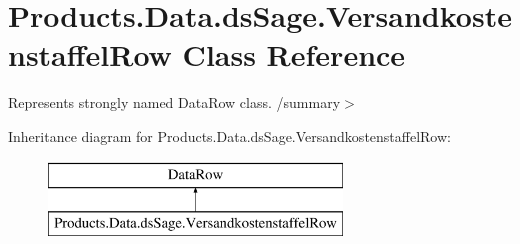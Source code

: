 \hypertarget{class_products_1_1_data_1_1ds_sage_1_1_versandkostenstaffel_row}{}\section{Products.\+Data.\+ds\+Sage.\+Versandkostenstaffel\+Row Class Reference}
\label{class_products_1_1_data_1_1ds_sage_1_1_versandkostenstaffel_row}


Represents strongly named Data\+Row class. /summary$>$  


Inheritance diagram for Products.\+Data.\+ds\+Sage.\+Versandkostenstaffel\+Row\+:\begin{figure}[H]
\begin{center}
\leavevmode
\includegraphics[height=2.000000cm]{class_products_1_1_data_1_1ds_sage_1_1_versandkostenstaffel_row}
\end{center}
\end{figure}
